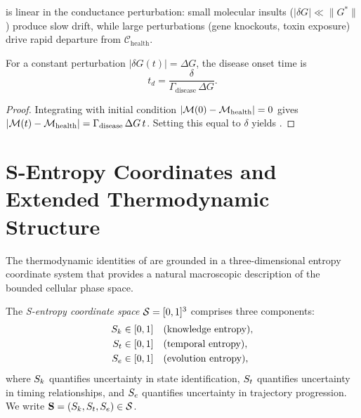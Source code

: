  is linear in the conductance perturbation:
small molecular insults ($|\delta G| \ll \|G^{*}\|$) produce slow drift,
while large perturbations (gene knockouts, toxin exposure) drive rapid
departure from $\mathcal{C}_{\mathrm{health}}$.

\begin{proposition}
\label{prop:onset-time}
For a constant perturbation $|\delta G(t)| = \Delta G$, the disease onset
time is
\begin{equation}
  t_d = \frac{\delta}{\Gamma_{\mathrm{disease}}\,\Delta G}.
  \label{eq:onset-time}
\end{equation}
\end{proposition}

\begin{proof}
Integrating  with initial condition
$|\mathcal{M}(0) - \mathcal{M}_{\mathrm{health}}| = 0$ gives
$|\mathcal{M}(t) - \mathcal{M}_{\mathrm{health}}| = \Gamma_{\mathrm{disease}}\,\Delta G\,t$.
Setting this equal to $\delta$ yields .
\end{proof}

\section{S-Entropy Coordinates and Extended Thermodynamic Structure}
\label{sec:ch07-s-entropy}

The thermodynamic identities of  are grounded in a
three-dimensional entropy coordinate system that provides a natural macroscopic
description of the bounded cellular phase space.

\begin{definition}
\label{def:ch07-s-entropy}
The \emph{S-entropy coordinate space} $\mathcal{S} = [0,1]^3$ comprises three
components:
\begin{align}
  S_k &\in [0,1] \quad \text{(knowledge entropy)}, \label{eq:ch07-Sk} \\
  S_t &\in [0,1] \quad \text{(temporal entropy)}, \label{eq:ch07-St} \\
  S_e &\in [0,1] \quad \text{(evolution entropy)}, \label{eq:ch07-Se}
\end{align}
where $S_k$ quantifies uncertainty in state identification, $S_t$ quantifies
uncertainty in timing relationships, and $S_e$ quantifies uncertainty in
trajectory progression.  We write $\mathbf{S} = (S_k,S_t,S_e) \in \mathcal{S}$.
\end{definition}

